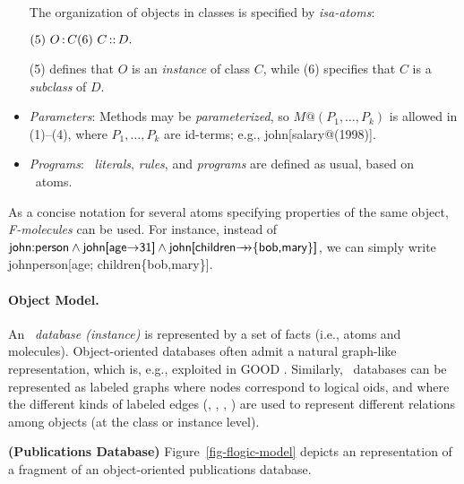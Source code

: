 \begin{itemize}
  The organization of objects in classes is specified by
  \emph{isa-atoms}: \medskip

  \begin{math}
    \hfill (5)~O\isa C \hfill (6)~C\subcl D. \hfill
  \end{math} \medskip

  (5) defines that $O$ is an \emph{instance} of class $C$, while (6)
  specifies that $C$ is a \emph{subclass} of $D$. 
\item \emph{Parameters}: Methods may be \emph{parameterized}, so
  \begin{math}
    M@(P_1,\dots,P_k)
  \end{math} is allowed in (1)--(4), where $P_1,\dots,P_k$ are
  id-terms; e.g., \textsf{john[salary@(1998)]}.
  
\item \emph{Programs}: \fl\ \emph{literals}, \emph{rules}, and
  \emph{programs} are defined as usual, based on \fl\ atoms.
\end{itemize}

\NI As a concise notation for several atoms specifying properties of the
same object, \emph{F-molecules} can be used. For instance, instead of
$\textsf{john:person}\land\textsf{john[age\ensuremath{{\rightarrow}}31]}\land\textsf{john[children\ensuremath{{\rightarrow\!\!\!\!\rightarrow}}\{bob,mary\}]}$, we can simply write
\textsf{john\isa person[age; children\mvd\{bob,mary\}]}.


\paragraph{Object Model.} 
An \emph{\fl\ database (instance)} is represented by a set of facts
(i.e., atoms and molecules). Object-oriented databases often admit a
natural graph-like representation, which is, e.g., exploited in GOOD
\cite{gyssens-paredaens-vdbussche-vgucht-TKDE-94}. Similarly, \fl\ 
databases can be represented as labeled graphs where nodes correspond
to logical oids, and where the different kinds of labeled edges (\fd,
\mvd, \Fd, \Mvd) are used to represent different relations among
objects (at the class or instance level).

\begin{example}
  {\bf (Publications Database)}
  Figure~\ref{fig-flogic-model} depicts an \fl representation of a fragment
  of an object-oriented publications database.
\end{example}


